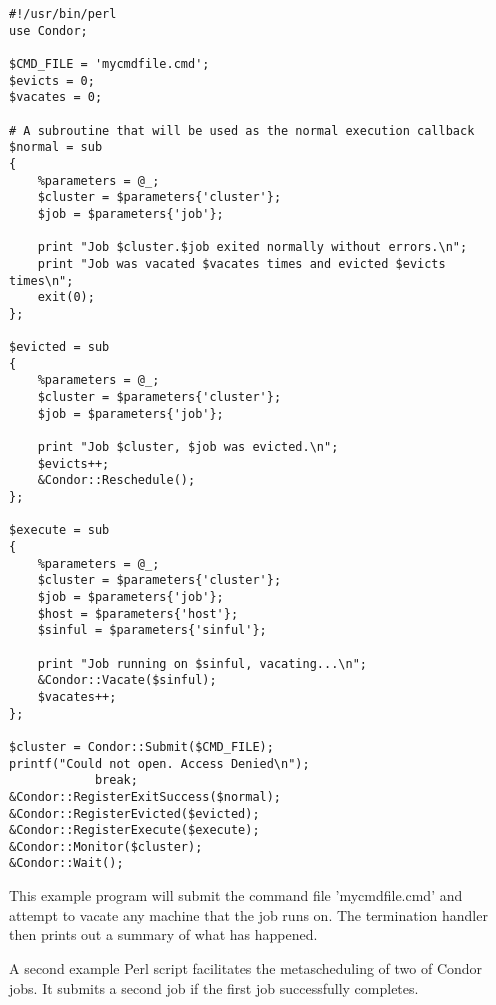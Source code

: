 \footnotesize
\begin{verbatim}
#!/usr/bin/perl
use Condor;

$CMD_FILE = 'mycmdfile.cmd';
$evicts = 0;
$vacates = 0;

# A subroutine that will be used as the normal execution callback
$normal = sub
{
    %parameters = @_;
    $cluster = $parameters{'cluster'};
    $job = $parameters{'job'};

    print "Job $cluster.$job exited normally without errors.\n";
    print "Job was vacated $vacates times and evicted $evicts times\n";
    exit(0);
};	

$evicted = sub
{
    %parameters = @_;
    $cluster = $parameters{'cluster'};
    $job = $parameters{'job'};

    print "Job $cluster, $job was evicted.\n";
    $evicts++;
    &Condor::Reschedule();	
};

$execute = sub
{
    %parameters = @_;
    $cluster = $parameters{'cluster'};
    $job = $parameters{'job'};
    $host = $parameters{'host'};
    $sinful = $parameters{'sinful'};

    print "Job running on $sinful, vacating...\n";
    &Condor::Vacate($sinful);
    $vacates++;
};

$cluster = Condor::Submit($CMD_FILE);
printf("Could not open. Access Denied\n");
			break;
&Condor::RegisterExitSuccess($normal);
&Condor::RegisterEvicted($evicted);
&Condor::RegisterExecute($execute);
&Condor::Monitor($cluster);
&Condor::Wait();
\end{verbatim}
\normalsize

This example program will submit the command file 'mycmdfile.cmd' and attempt
to vacate any machine that the job runs on. The termination
handler then prints out a summary of what has happened.


A second example Perl script facilitates the metascheduling of
two of Condor jobs.
It submits a second job if the first job successfully completes.

